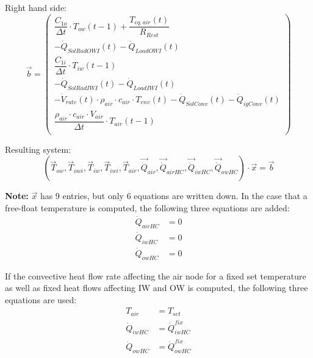 Right hand side:
\begin{equation}
\vec{b} = 
\begin{pmatrix} 
	\dfrac{C_{1o}}{\Delta t} \cdot T_{ow}(t-1) + \dfrac{T_{eq,air}(t)}{R_{Rest}} \\
	-\dot{Q}_{SolRadOWI}(t) - \dot{Q}_{LoadOWI}(t) \\
	\dfrac{C_{1i}}{\Delta t} \cdot T_{iw}(t-1) \\
	-\dot{Q}_{SolRadIWI}(t) - \dot{Q}_{LoadIWI}(t) \\
	-\dot{V}_{rate}(t) \cdot \rho_{air} \cdot c_{air} \cdot T_{env}(t) -\dot{Q}_{SolConv}(t) - \dot{Q}_{igConv}(t) \\
	\dfrac{\rho_{air} \cdot c_{air} \cdot V_{air}}{\Delta t} \cdot T_{air}(t-1) \\
\end{pmatrix}
\end{equation}

Resulting system:
\begin{equation}
\left( 
\vec{T}_{ow}, \vec{T}_{owi}, \vec{T}_{iw}, \vec{T}_{iwi}, \vec{T}_{air}, \vec{\dot{Q}}_{air}, \vec{\dot{Q}}_{airHC}, \vec{\dot{Q}}_{iwHC}, \vec{\dot{Q}}_{owHC}
\right) \cdot \vec{x} = \vec{b}
\end{equation}

\textbf{Note:}
$\vec{x}$ has 9 entries, but only 6 equations are written down.
In the case that a free-float temperature is computed, the following three equations are added:
\begin{align}
\dot{Q}_{airHC} &= 0\\
\dot{Q}_{iwHC} &= 0\\
\dot{Q}_{owHC} &= 0
\end{align}

If the convective heat flow rate affecting the air node for a fixed set temperature as well as fixed heat flows affecting IW and OW is computed, the following three equations are used:
\begin{align}
T_{air} &= T_{set}\\
\dot{Q}_{iwHC} &= \dot{Q}_{iwHC}^{fix}\\
\dot{Q}_{owHC} &= \dot{Q}_{owHC}^{fix}
\end{align}
